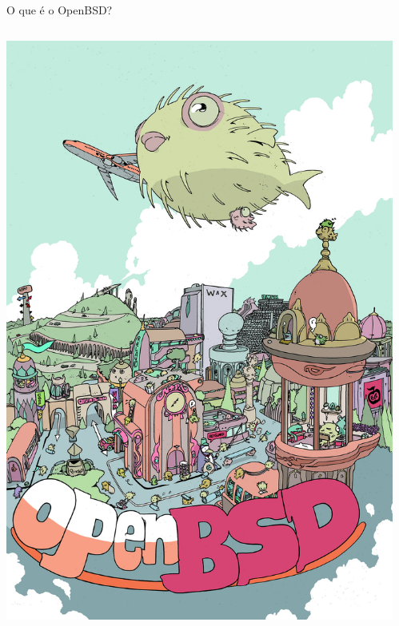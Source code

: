 \documentclass[9pt,xcolor=table]{beamer}
\begin{document}
\begin{frame}{O que é o OpenBSD?}
    \begin{columns}
        \begin{column}{0.3\textwidth}
            \centering
            \includegraphics[width=\textwidth]{imagens/openbsd-fan.jpg}
        \end{column}
        \begin{column}{0.3\textwidth}
            \centering

\end{column}
\end{columns}
\end{frame}
\end{document}
